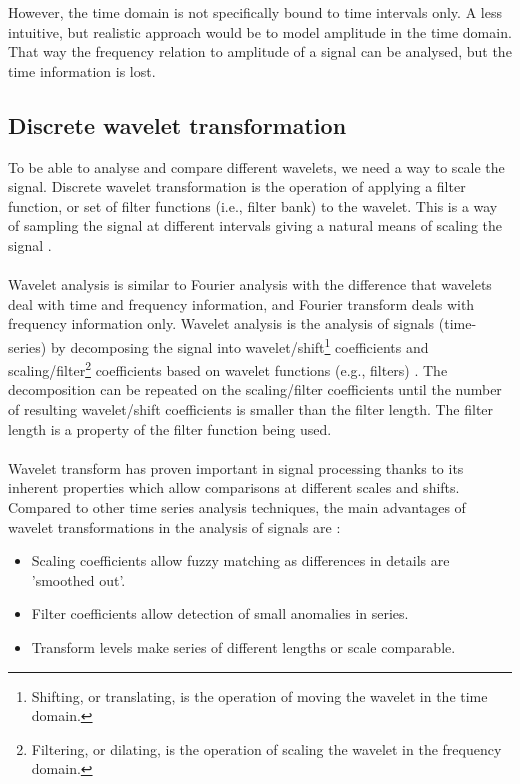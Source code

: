 However, the time domain is not specifically bound to time intervals only. A
less intuitive, but realistic approach would be to model amplitude in the time
domain. That way the frequency relation to amplitude of a signal can be
analysed, but the time information is lost.

\subsection{Discrete wavelet transformation}
To be able to analyse and compare different wavelets, we need a way to scale
the signal. Discrete wavelet transformation is the operation of applying a
filter function, or set of filter functions (i.e., filter bank) to the wavelet.
This is a way of sampling the signal at different intervals giving a natural
means of scaling the signal \cite{karus2013}.

\paragraph{}
Wavelet analysis is similar to Fourier analysis with the difference that
wavelets deal with time and frequency information, and Fourier transform deals
with frequency information only. Wavelet analysis is the analysis of signals
(time-series) by decomposing the signal into wavelet/shift\footnote{Shifting,
or translating, is the operation of moving the wavelet in the time domain.}
coefficients and scaling/filter\footnote{Filtering, or dilating, is the
operation of scaling the wavelet in the frequency domain.} coefficients based
on wavelet functions (e.g., filters) \cite{karus2013}. The decomposition can be
repeated on the scaling/filter coefficients until the number of resulting
wavelet/shift coefficients is smaller than the filter length. The filter length
is a property of the filter function being used.

\paragraph{}
Wavelet transform has proven important in signal processing thanks to its
inherent properties which allow comparisons at different scales and shifts.
Compared to other time series analysis techniques, the main advantages of
wavelet transformations in the analysis of signals are \cite{karus2013}:
\begin{itemize}
	\item Scaling coefficients allow fuzzy matching as differences in details are
	'smoothed out'.
	\item Filter coefficients allow detection of small anomalies in series.
	\item Transform levels make series of different lengths or scale comparable.
\end{itemize}

